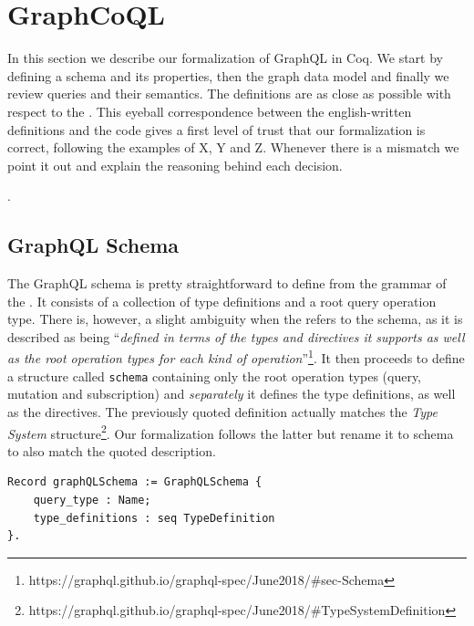 \section{GraphCoQL}\label{sec:form}

In this section we describe our formalization of GraphQL in Coq. We start by defining a schema and its properties, then the graph data model and finally we review queries and their semantics. The definitions are as close as possible with respect to the \spec{}. This eyeball correspondence between the english-written definitions and the code gives a first level of trust that our formalization is correct, following the examples of X, Y and Z. Whenever there is a mismatch we point it out and explain the reasoning behind each decision.


.

\subsection{GraphQL Schema}\label{subsec:schema}

The GraphQL schema is pretty straightforward to define from the grammar of the \spec{}. It consists of a collection of type definitions and a root query operation type. There is, however, a slight ambiguity when the \spec{} refers to the schema, as it is described as being ``\textit{defined in terms of the types and directives it supports as well as the root operation types for each kind of operation}''\footnote{https://graphql.github.io/graphql-spec/June2018/\#sec-Schema}. It then proceeds to define a structure called \texttt{schema} containing only the root operation types (query, mutation and subscription) and \textit{separately} it defines the type definitions, as well as the directives. The previously quoted definition actually matches the \textit{Type System} structure\footnote{https://graphql.github.io/graphql-spec/June2018/\#TypeSystemDefinition}. Our formalization follows the latter but rename it to schema to also match the quoted description.

\begin{verbatim}
Record graphQLSchema := GraphQLSchema {
    query_type : Name;
    type_definitions : seq TypeDefinition
}.
\end{verbatim}

